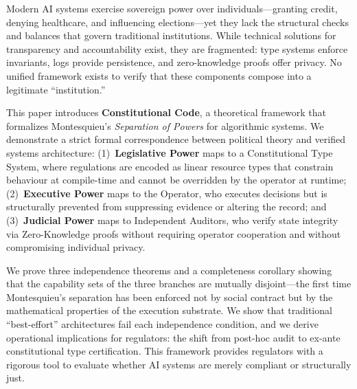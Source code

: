 Modern AI systems exercise sovereign power over individuals---granting
credit, denying healthcare, and influencing elections---yet they lack
the structural checks and balances that govern traditional institutions.
While technical solutions for transparency and accountability exist,
they are fragmented: type systems enforce invariants, logs provide
persistence, and zero-knowledge proofs offer privacy. No unified
framework exists to verify that these components compose into a
legitimate ``institution.''

This paper introduces \textbf{Constitutional Code}, a theoretical
framework that formalizes Montesquieu's \textit{Separation of Powers}
for algorithmic systems. We demonstrate a strict formal correspondence
between political theory and verified systems architecture:
(1)~\textbf{Legislative Power} maps to a Constitutional Type System,
where regulations are encoded as linear resource types that constrain
behaviour at compile-time and cannot be overridden by the operator at
runtime; (2)~\textbf{Executive Power} maps to the Operator, who
executes decisions but is structurally prevented from suppressing
evidence or altering the record; and (3)~\textbf{Judicial Power} maps
to Independent Auditors, who verify state integrity via Zero-Knowledge
proofs without requiring operator cooperation and without compromising
individual privacy.

We prove three independence theorems and a completeness corollary
showing that the capability sets of the three branches are mutually
disjoint---the first time Montesquieu's separation has been enforced
not by social contract but by the mathematical properties of the
execution substrate. We show that traditional ``best-effort''
architectures fail each independence condition, and we derive
operational implications for regulators: the shift from post-hoc
audit to ex-ante constitutional type certification. This framework
provides regulators with a rigorous tool to evaluate whether AI
systems are merely compliant or structurally just.
